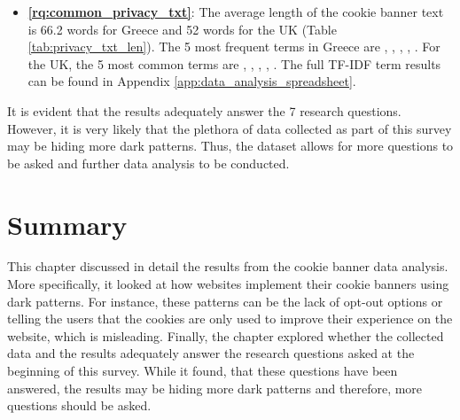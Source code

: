 \documentclass[../main.tex]{subfiles}
\begin{document}
\begin{itemize}
    \item \textbf{\ref{rq:common_privacy_txt}}: The average length of the cookie banner text is 66.2 words for Greece and 52 words for the UK (Table \ref{tab:privacy_txt_len}). The 5 most frequent terms in Greece are , , , , . For the UK, the 5 most common terms are , , , , . The full TF-IDF term results can be found in Appendix \ref{app:data_analysis_spreadsheet}.
\end{itemize}

It is evident that the results adequately answer the 7 research questions. However, it is very likely that the plethora of data collected as part of this survey may be hiding more dark patterns. Thus, the dataset allows for more questions to be asked and further data analysis to be conducted. 

\section{Summary}
This chapter discussed in detail the results from the cookie banner data analysis. More specifically, it looked at how websites implement their cookie banners using dark patterns. For instance, these patterns can be the lack of opt-out options or telling the users that the cookies are only used to improve their experience on the website, which is misleading. Finally, the chapter explored whether the collected data and the results adequately answer the research questions asked at the beginning of this survey. While it found, that these questions have been answered, the results may be hiding more dark patterns and therefore, more questions should be asked.
\end{document}
